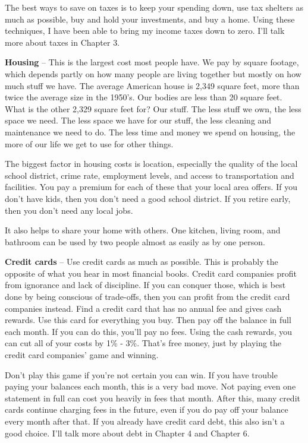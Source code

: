 The best ways to save on taxes is to keep your spending down, use tax shelters as much as possible, buy and hold your investments, and buy a home. Using these techniques, I have been able to bring my income taxes down to zero. I'll talk more about taxes in Chapter 3.

\textbf{Housing} -- This is the largest cost most people have. We pay by square footage, which depends partly on how many people are living together but mostly on how much stuff we have. The average American house is 2,349 square feet, more than twice the average size in the 1950's.\cite{npr-dream-house} Our bodies are less than 20 square feet. What is the other 2,329 square feet for? Our stuff. The less stuff we own, the less space we need. The less space we have for our stuff, the less cleaning and maintenance we need to do. The less time and money we spend on housing, the more of our life we get to use for other things.

The biggest factor in housing costs is location, especially the quality of the local school district, crime rate, employment levels, and access to transportation and facilities. You pay a premium for each of these that your local area offers. If you don't have kids, then you don't need a good school district. If you retire early, then you don't need any local jobs.

It also helps to share your home with others. One kitchen, living room, and bathroom can be used by two people almost as easily as by one person.

\textbf{Credit cards} -- Use credit cards as much as possible. This is probably the opposite of what you hear in most financial books. Credit card companies profit from ignorance and lack of discipline. If you can conquer those, which is best done by being conscious of trade-offs, then you can profit from the credit card companies instead. Find a credit card that has no annual fee and gives cash rewards. Use this card for everything you buy. Then pay off the balance in full each month. If you can do this, you'll pay no fees. Using the cash rewards, you can cut all of your costs by 1\% - 3\%. That's free money, just by playing the credit card companies' game and winning.

Don't play this game if you're not certain you can win. If you have trouble paying your balances each month, this is a very bad move. Not paying even one statement in full can cost you heavily in fees that month. After this, many credit cards continue charging fees in the future, even if you do pay off your balance every month after that. If you already have credit card debt, this also isn't a good choice. I'll talk more about debt in Chapter 4 and Chapter 6.

